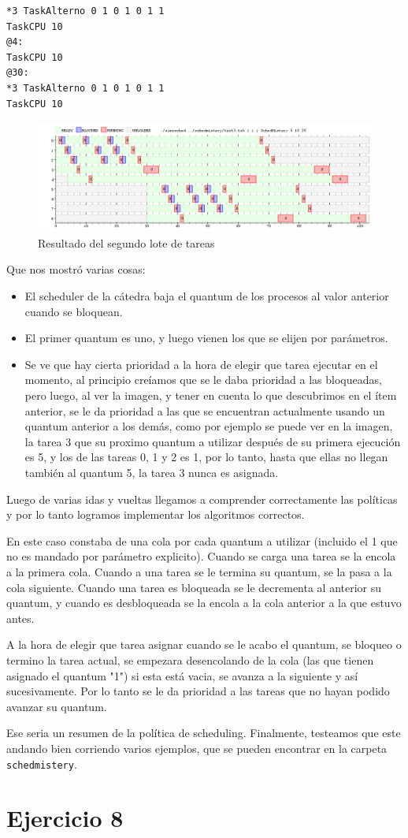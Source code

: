 \documentclass{article}
\begin{document}
\begin{verbatim}
*3 TaskAlterno 0 1 0 1 0 1 1
TaskCPU 10
@4:
TaskCPU 10
@30:
*3 TaskAlterno 0 1 0 1 0 1 1
TaskCPU 10
\end{verbatim}

\begin{figure}[h!]
\caption{Resultado del segundo lote de tareas \label{grf:ex7-2}}
\centering
\includegraphics[width=15cm]{../ejercicios/ejercicio 7-3}
\end{figure}

Que nos mostró varias cosas:
\begin{itemize}
\item El scheduler de la cátedra baja el quantum de los procesos al valor anterior cuando se bloquean.
\item El primer quantum es uno, y luego vienen los que se elijen por parámetros.
\item Se ve que hay cierta prioridad a la hora de elegir que tarea ejecutar en el momento, al principio creíamos que se le daba prioridad a las bloqueadas, pero luego, al ver la imagen, y tener en cuenta lo que descubrimos en el ítem anterior, se le da prioridad a las que se encuentran actualmente usando un quantum anterior a los demás, como por ejemplo se puede ver en la imagen, la tarea 3 que su proximo quantum a utilizar después de su primera ejecución es 5, y los de las tareas 0, 1 y 2 es 1, por lo tanto, hasta que ellas no llegan también al quantum 5, la tarea 3 nunca es asignada.
\end{itemize}

Luego de varias idas y vueltas llegamos a comprender correctamente las políticas y por lo tanto logramos implementar los algoritmos correctos.\par
En este caso constaba de una cola por cada quantum a utilizar (incluido el 1 que no es mandado por parámetro explicito). Cuando se carga una tarea se la encola a la primera cola. Cuando a una tarea se le termina su quantum, se la pasa a la cola siguiente. Cuando una tarea es bloqueada se le decrementa al anterior su quantum, y cuando es desbloqueada se la encola a la cola anterior a la que estuvo antes.\par
A la hora de elegir que tarea asignar cuando se le acabo el quantum, se bloqueo o termino la tarea actual, se empezara desencolando de la cola (las que tienen asignado el quantum "1") si esta está vacia, se avanza a la siguiente y así sucesivamente. Por lo tanto se le da prioridad a las tareas que no hayan podido avanzar su quantum.\par
Ese seria un resumen de la política de scheduling.
Finalmente, testeamos que este andando bien corriendo varios ejemplos, que se pueden encontrar en la carpeta \verb`schedmistery`.

\section{Ejercicio 8}
\end{document}
